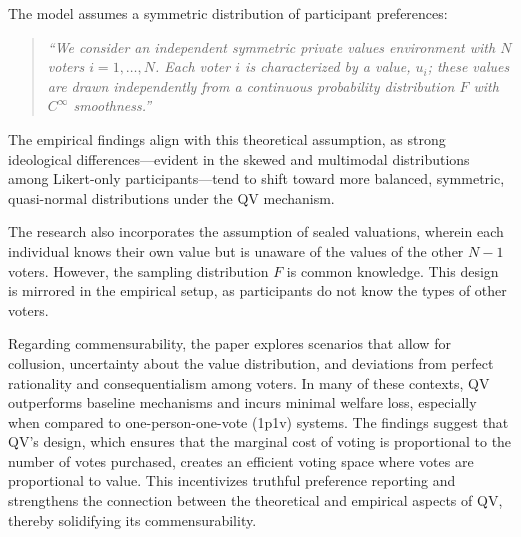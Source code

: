 \documentclass[11pt,a4paper]{article}
\begin{document}
\noindent The model assumes a symmetric distribution of participant preferences: 
\begin{quote}
    \textit{``We consider an independent symmetric private values environment with $N$ voters $i = 1, \dots, N$. Each voter $i$ is characterized by a value, $u_i$; these values are drawn independently from a continuous probability distribution $F$ with $C^\infty$ smoothness.''}
\end{quote}
\noindent The empirical findings align with this theoretical assumption, as strong ideological differences—evident in the skewed and multimodal distributions among Likert-only participants—tend to shift toward more balanced, symmetric, quasi-normal distributions under the QV mechanism.

\noindent The research also incorporates the assumption of sealed valuations, wherein each individual knows their own value but is unaware of the values of the other $N-1$ voters. However, the sampling distribution $F$ is common knowledge. This design is mirrored in the empirical setup, as participants do not know the types of other voters.

\noindent Regarding commensurability, the paper explores scenarios that allow for collusion, uncertainty about the value distribution, and deviations from perfect rationality and consequentialism among voters. In many of these contexts, QV outperforms baseline mechanisms and incurs minimal welfare loss, especially when compared to one-person-one-vote (1p1v) systems. The findings suggest that QV's design, which ensures that the marginal cost of voting is proportional to the number of votes purchased, creates an efficient voting space where votes are proportional to value. This incentivizes truthful preference reporting and strengthens the connection between the theoretical and empirical aspects of QV, thereby solidifying its commensurability.
\end{document}
